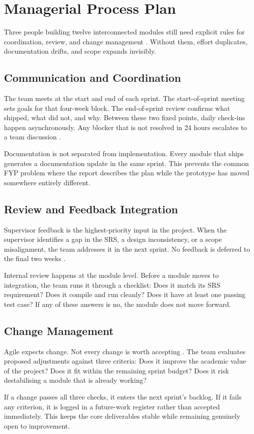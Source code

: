 \section{Managerial Process Plan}

Three people building twelve interconnected modules still need explicit rules for coordination, review, and change management \cite{spp1}. Without them, effort duplicates, documentation drifts, and scope expands invisibly.

\subsection{Communication and Coordination}

The team meets at the start and end of each sprint. The start-of-sprint meeting sets goals for that four-week block. The end-of-sprint review confirms what shipped, what did not, and why. Between these two fixed points, daily check-ins happen asynchronously. Any blocker that is not resolved in 24 hours escalates to a team discussion \cite{scrum1}.

Documentation is not separated from implementation. Every module that ships generates a documentation update in the same sprint. This prevents the common FYP problem where the report describes the plan while the prototype has moved somewhere entirely different.

\subsection{Review and Feedback Integration}

Supervisor feedback is the highest-priority input in the project. When the supervisor identifies a gap in the SRS, a design inconsistency, or a scope misalignment, the team addresses it in the next sprint. No feedback is deferred to the final two weeks \cite{agile1}.

Internal review happens at the module level. Before a module moves to integration, the team runs it through a checklist: Does it match its SRS requirement? Does it compile and run cleanly? Does it have at least one passing test case? If any of these answers is no, the module does not move forward.

\subsection{Change Management}

Agile expects change. Not every change is worth accepting \cite{agile1}. The team evaluates proposed adjustments against three criteria: Does it improve the academic value of the project? Does it fit within the remaining sprint budget? Does it risk destabilising a module that is already working?

If a change passes all three checks, it enters the next sprint's backlog. If it fails any criterion, it is logged in a future-work register rather than accepted immediately. This keeps the core deliverables stable while remaining genuinely open to improvement.